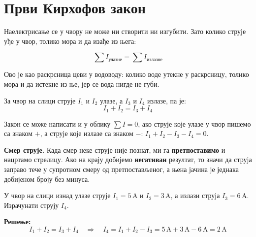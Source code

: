 \documentclass[12pt]{article}
\begin{document}
\section{Први Кирхофов закон}

Наелектрисање се у чвору не може ни створити ни изгубити. Зато колико
струје уђе у чвор, толико мора и да изађе из њега:

\begin{kljucno}
\[
\sum I_{\text{улазне}} = \sum I_{\text{излазне}}
\]
\end{kljucno}

Ово је као раскрсница цеви у водоводу: колико воде утекне у раскрсницу,
толико мора и да истекне из ње, јер се вода нигде не губи.

\begin{center}
\end{center}

За чвор на слици струје $I_1$ и $I_2$ улазе, а $I_3$ и $I_4$ излазе, па је:
\[
I_1 + I_2 = I_3 + I_4
\]

Закон се може написати и у облику $\sum I = 0$, ако струје које улазе у чвор
пишемо са знаком $+$, а струје које излазе са знаком $-$:
$I_1 + I_2 - I_3 - I_4 = 0$.

\textbf{Смер струје.} Када смер неке струје није познат, ми га
\textbf{претпоставимо} и нацртамо стрелицу. Ако на крају добијемо
\textbf{негативан} резултат, то значи да струја заправо тече у супротном смеру
од претпостављеног, а њена јачина је једнака добијеном броју без минуса.

\begin{primer}
У чвор на слици изнад улазе струје $I_1 = 5\,\text{A}$ и $I_2 = 3\,\text{A}$,
а излази струја $I_3 = 6\,\text{A}$. Израчунати струју $I_4$.

\textbf{Решење:}
\[
I_1 + I_2 = I_3 + I_4
\quad\Longrightarrow\quad
I_4 = I_1 + I_2 - I_3 = 5\,\text{A} + 3\,\text{A} - 6\,\text{A} = 2\,\text{A}
\]
\end{primer}
\end{document}
